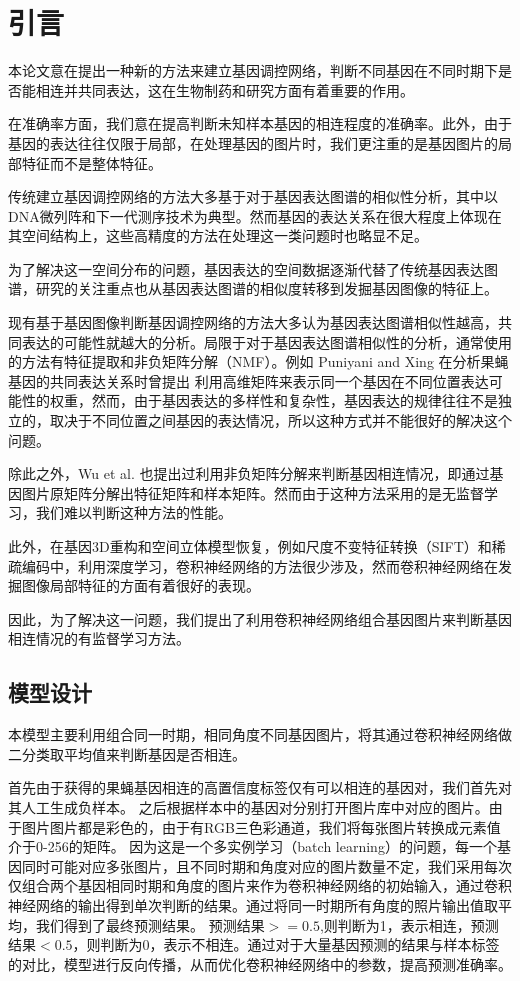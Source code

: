 \documentclass[10.5pt,twocolumn]{jbuaa}
\begin{document}
\section{引言}
本论文意在提出一种新的方法来建立基因调控网络，判断不同基因在不同时期下是否能相连并共同表达，这在生物制药和研究方面有着重要的作用。

在准确率方面，我们意在提高判断未知样本基因的相连程度的准确率。此外，由于基因的表达往往仅限于局部，在处理基因的图片时，我们更注重的是基因图片的局部特征而不是整体特征。

传统建立基因调控网络的方法大多基于对于基因表达图谱的相似性分析，其中以DNA微列阵和下一代测序技术为典型。然而基因的表达关系在很大程度上体现在其空间结构上，这些高精度的方法在处理这一类问题时也略显不足。

为了解决这一空间分布的问题，基因表达的空间数据逐渐代替了传统基因表达图谱，研究的关注重点也从基因表达图谱的相似度转移到发掘基因图像的特征上。

现有基于基因图像判断基因调控网络的方法大多认为基因表达图谱相似性越高，共同表达的可能性就越大的分析。局限于对于基因表达图谱相似性的分析，通常使用的方法有特征提取和非负矩阵分解（NMF）。例如 Puniyani and Xing 在分析果蝇基因的共同表达关系时曾提出
利用高维矩阵来表示同一个基因在不同位置表达可能性的权重，然而，由于基因表达的多样性和复杂性，基因表达的规律往往不是独立的，取决于不同位置之间基因的表达情况，所以这种方式并不能很好的解决这个问题。

除此之外，Wu et al. 也提出过利用非负矩阵分解来判断基因相连情况，即通过基因图片原矩阵分解出特征矩阵和样本矩阵。然而由于这种方法采用的是无监督学习，我们难以判断这种方法的性能。

此外，在基因3D重构和空间立体模型恢复，例如尺度不变特征转换（SIFT）和稀疏编码中，利用深度学习，卷积神经网络的方法很少涉及，然而卷积神经网络在发掘图像局部特征的方面有着很好的表现。

因此，为了解决这一问题，我们提出了利用卷积神经网络组合基因图片来判断基因相连情况的有监督学习方法。


\subsection{模型设计}
	本模型主要利用组合同一时期，相同角度不同基因图片，将其通过卷积神经网络做二分类取平均值来判断基因是否相连。

首先由于获得的果蝇基因相连的高置信度标签仅有可以相连的基因对，我们首先对其人工生成负样本。
之后根据样本中的基因对分别打开图片库中对应的图片。由于图片图片都是彩色的，由于有RGB三色彩通道，我们将每张图片转换成元素值介于0-256的矩阵。
因为这是一个多实例学习（batch learning）的问题，每一个基因同时可能对应多张图片，且不同时期和角度对应的图片数量不定，我们采用每次仅组合两个基因相同时期和角度的图片来作为卷积神经网络的初始输入，通过卷积神经网络的输出得到单次判断的结果。通过将同一时期所有角度的照片输出值取平均，我们得到了最终预测结果。
预测结果$>= 0.5$,则判断为1，表示相连，预测结果$< 0.5$，则判断为0，表示不相连。通过对于大量基因预测的结果与样本标签的对比，模型进行反向传播，从而优化卷积神经网络中的参数，提高预测准确率。
\end{document}
